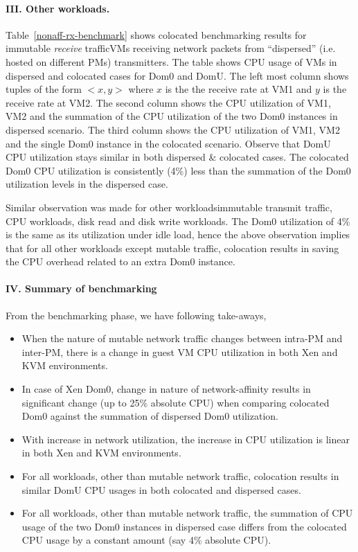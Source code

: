 \paragraph{III. Other workloads.}
Table~\ref{nonaff-rx-benchmark} shows colocated benchmarking
results for immutable \textit{receive} traffic\textemdash{}VMs receiving 
network packets from ``dispersed'' (i.e. hosted on different PMs) transmitters. 
The table shows CPU usage of VMs in
dispersed and colocated cases for Dom0 and DomU.
The left most column shows tuples of the form $<x,y>$ where
$x$ is the the receive rate at VM1 and $y$ is the receive
rate at VM2. The second column shows the CPU utilization of 
VM1, VM2 and the summation of the CPU utilization of the two 
Dom0 instances in dispersed scenario. The third column shows
the CPU utilization of VM1, VM2 and the single Dom0 instance
in the colocated scenario.
Observe that
DomU CPU utilization stays similar in both dispersed \& colocated
cases.
The colocated Dom0
CPU utilization is consistently (4\%) less than 
the summation of the Dom0 utilization
levels in the dispersed case.

Similar observation was made for other workloads\textemdash{}immutable
transmit traffic, CPU workloads, disk read and disk write workloads. 
The Dom0 utilization of 4\% is the same as its utilization
under idle load, hence the above observation implies that for all
other workloads except mutable traffic, colocation results in saving
the CPU overhead related to an extra Dom0 instance.

\paragraph{IV. Summary of benchmarking}
From the benchmarking phase, we have following take-aways,
\begin{itemize}
  \item When the nature of mutable network traffic changes between intra-PM
				  and inter-PM, there
				  is a change in guest VM CPU utilization in both Xen
				  and KVM environments. 
  \item In case of Xen Dom0, change in nature of network-affinity results
				  in significant change (up to 25\% absolute CPU) when comparing
				  colocated Dom0 against the summation of dispersed Dom0 utilization.
  \item With increase in network utilization, 
	  the increase in CPU utilization is linear
			 in both Xen and KVM environments.
	\item For all workloads, other than mutable network traffic, colocation results
		in similar DomU CPU usages in both colocated and dispersed cases.
	\item For all workloads, other than mutable network traffic, the summation of CPU 
		usage of the two Dom0 instances in dispersed case differs from the 
		colocated CPU usage by a constant amount (say 4\% absolute CPU). 
\end{itemize}
		  
